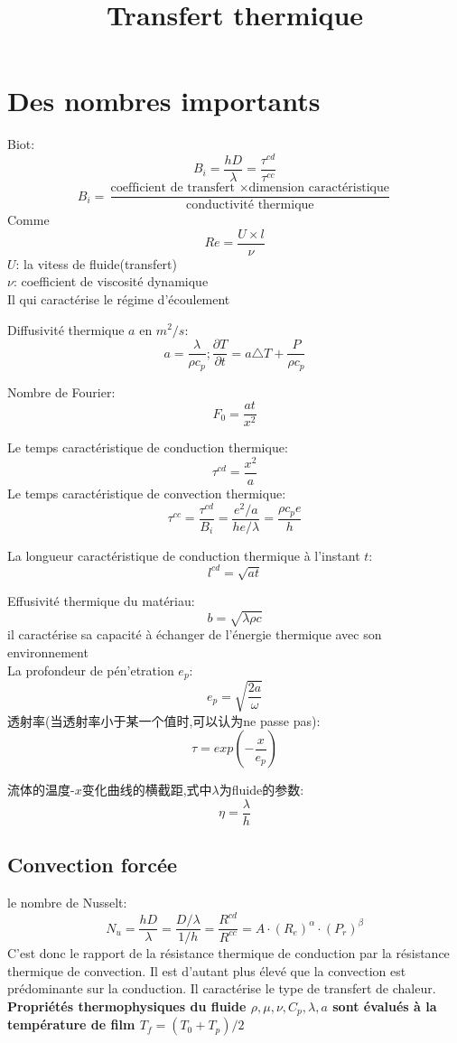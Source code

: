 \documentclass{article}
\begin{document}
\title{Transfert thermique}
\maketitle
\tableofcontents
\newpage
\section{Des nombres importants}
Biot:$$B_i = \frac{ hD}{\lambda }=\frac{\tau^{cd}}{\tau^{cc}}$$
$$B_i = \frac{ \text{coefficient de transfert } \times \text{dimension caract\'eristique} }{\text{conductivit\'e thermique}}$$
Comme $$Re=\frac{U\times l}{\nu}$$
$U$: la vitess de fluide(transfert)\\
$\nu$: coefficient de viscosit\'e dynamique\\
Il qui caract\'erise le r\'egime d'\'ecoulement

Diffusivit\'e thermique $a$ en $m^2/s$:$$a=\frac{\lambda }{\rho c_p};\frac{\partial T}{\partial t}=a\triangle T + \frac{P}{\rho c_p}$$

Nombre de Fourier:$$F_0=\frac{ at}{x^2}$$

Le temps caract\'eristique de conduction thermique:$$\tau^{cd}=\frac{x^2}{a}$$
Le temps caract\'eristique de convection thermique:$$\tau^{cc}=\frac{\tau^{cd}}{B_i}=\frac{e^2/a }{he/\lambda }=\frac{\rho c_p e}{h}$$

La longueur caract\'eristique de conduction thermique \`a l'instant $t$:$$l^{cd}=\sqrt{at}$$

Effusivit\'e thermique du mat\'eriau:$$b=\sqrt{\lambda \rho c}$$
il caract\'erise sa capacit\'e \`a \'echanger de l'\'energie thermique avec son environnement\\

La profondeur de p\'en'etration $e_p$:$$e_p=\sqrt{\frac{2a}{\omega}}$$
透射率(当透射率小于某一个值时,可以认为ne passe pas):$$\tau = exp(-\frac{x}{e_p})$$


流体的温度-$x$变化曲线的横截距,式中$\lambda$为fluide的参数:$$\eta=\frac{\lambda }{h}$$

\subsection{Convection forc\'ee}
le nombre de Nusselt:$$N_u = \frac{hD}{\lambda }=\frac{D/\lambda }{1/h}=\frac{R^{cd}}{R^{cc}}=A\cdot (R_e)^{\alpha}\cdot (P_r)^{\beta}$$
C'est donc le rapport de la r\'esistance thermique de conduction par la r\'esistance thermique de convection. Il est d'autant plus \'elev\'e que la convection est pr\'edominante sur la conduction. Il caract\'erise le type de transfert
de chaleur.\\
\textbf{Propri\'et\'es thermophysiques du fluide $\rho, \mu, \nu, C_p, \lambda, a$ sont \'evalu\'es \`a la temp\'erature de film $T_f = (T_0 + T_p)/2$}
\end{document}
